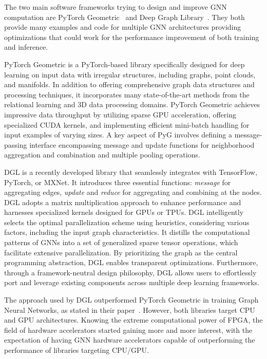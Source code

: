 The two main software frameworks trying to design and improve GNN computation are PyTorch Geometric~\cite{DBLP:journals/corr/abs-1903-02428} and Deep Graph Library~\cite{DBLP:journals/corr/abs-1909-01315}.
They both provide many examples and code for multiple GNN architectures providing optimizations that could work for the performance improvement of both training and inference.

PyTorch Geometric is a PyTorch-based library specifically designed for deep learning on input data with irregular structures, including graphs, point clouds, and manifolds.
In addition to offering comprehensive graph data structures and processing techniques, it incorporates many state-of-the-art methods from the relational learning and 3D data processing domains.
PyTorch Geometric achieves impressive data throughput by utilizing sparse GPU acceleration, offering specialized CUDA kernels, and implementing efficient mini-batch handling for input examples of varying sizes.
A key aspect of PyG involves defining a message-passing interface encompassing message and update functions for neighborhood aggregation and combination and multiple pooling operations.

DGL is a recently developed library that seamlessly integrates with TensorFlow, PyTorch, or MXNet.
It introduces three essential functions: \textit{message} for aggregating edges, \textit{update} and \textit{reduce} for aggregating and combining at the nodes.
DGL adopts a matrix multiplication approach to enhance performance and harnesses specialized kernels designed for GPUs or TPUs.
DGL intelligently selects the optimal parallelization scheme using heuristics, considering various factors, including the input graph characteristics.
It distills the computational patterns of GNNs into a set of generalized sparse tensor operations, which facilitate extensive parallelization.
By prioritizing the graph as the central programming abstraction, DGL enables transparent optimizations.
Furthermore, through a framework-neutral design philosophy, DGL allows users to effortlessly port and leverage existing components across multiple deep learning frameworks.

The approach used by DGL outperformed PyTorch Geometric in training Graph Neural Networks, as stated in their paper~\cite{DBLP:journals/corr/abs-1909-01315}.
However, both libraries target CPU and GPU architectures.
Knowing the extreme computational power of FPGA, the field of hardware accelerators started gaining more and more interest, with the expectation of having GNN hardware accelerators capable of outperforming the performance of libraries targeting CPU/GPU.

